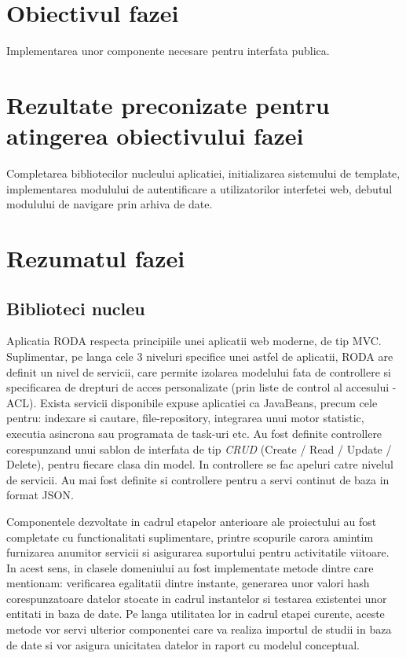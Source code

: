 \documentclass[a4paper, 10pt]{article}
\begin{document}
{\section{Obiectivul fazei}


Implementarea unor componente necesare pentru interfata publica.

\section{Rezultate preconizate pentru atingerea obiectivului fazei}


Completarea bibliotecilor nucleului aplicatiei, initializarea sistemului de
template, implementarea modulului de autentificare a utilizatorilor interfetei
web, debutul modulului de navigare prin arhiva de date.

\section{Rezumatul fazei}

\medskip

\subsection*{Biblioteci nucleu}

\medskip

Aplicatia RODA respecta principiile unei aplicatii web moderne, de tip MVC. Suplimentar, pe langa cele 3 niveluri specifice unei astfel de aplicatii, RODA are definit un nivel de servicii, care permite izolarea modelului fata de controllere si specificarea de drepturi de acces personalizate (prin liste de control al accesului - ACL). Exista servicii disponibile expuse aplicatiei ca JavaBeans, precum cele pentru: 
indexare si cautare, file-repository, integrarea unui motor statistic, executia asincrona sau programata de task-uri etc. 
Au fost definite controllere corespunzand unui sablon de interfata de tip \emph{CRUD}
(Create / Read / Update / Delete), pentru fiecare clasa din model. 
In controllere se fac apeluri catre nivelul de servicii. 
Au mai fost definite si controllere pentru a servi continut de baza in format JSON.

\medskip

Componentele dezvoltate in cadrul etapelor anterioare ale proiectului au fost completate cu functionalitati suplimentare, printre scopurile carora amintim furnizarea anumitor servicii si asigurarea suportului pentru activitatile viitoare. In acest sens, in clasele domeniului au fost implementate metode dintre care mentionam: verificarea egalitatii dintre instante, generarea unor valori hash corespunzatoare datelor stocate in cadrul instantelor si testarea existentei unor entitati in baza de date. Pe langa utilitatea lor in cadrul etapei curente, aceste metode vor servi ulterior componentei care va realiza importul de studii in baza de date si vor asigura unicitatea datelor in raport cu modelul conceptual. 

}
\end{document}
